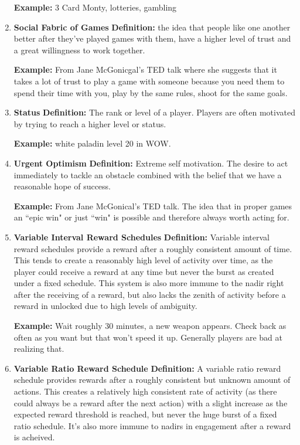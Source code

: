\begin{enumerate}
\textbf{Example:} 3 Card Monty, lotteries, gambling

\item \textbf{Social Fabric of Games}
\textbf{Definition:} the idea that people like one another better after they’ve played games with them, have a higher level of trust and a great willingness to work together.

\textbf{Example:} From Jane McGonicgal’s TED talk where she suggests that it takes a lot of trust to play a game with someone because you need them to spend their time with you, play by the same rules, shoot for the same goals.

\item \textbf{Status}
\textbf{Definition:} The rank or level of a player. Players are often motivated by trying to reach a higher level or status.

\textbf{Example:} white paladin level 20 in WOW.

\item \textbf{Urgent Optimism}
\textbf{Definition:} Extreme self motivation. The desire to act immediately to tackle an obstacle combined with the belief that we have a reasonable hope of success.

\textbf{Example:} From Jane McGonical’s TED talk. The idea that in proper games an ``epic win" or just ``win" is possible and therefore always worth acting for.

\item \textbf{Variable Interval Reward Schedules}
\textbf{Definition:} Variable interval reward schedules provide a reward after a roughly consistent amount of time. This tends to create a reasonably high level of activity over time, as the player could receive a reward at any time but never the burst as created under a fixed schedule. This system is also more immune to the nadir right after the receiving of a reward, but also lacks the zenith of activity before a reward in unlocked due to high levels of ambiguity.

\textbf{Example:} Wait roughly 30 minutes, a new weapon appears. Check back as often as you want but that won’t speed it up. Generally players are bad at realizing that.

\item \textbf{Variable Ratio Reward Schedule}
\textbf{Definition:} A variable ratio reward schedule provides rewards after a roughly consistent but unknown amount of actions. This creates a relatively high consistent rate of activity (as there could always be a reward after the next action) with a slight increase as the expected reward threshold is reached, but never the huge burst of a fixed ratio schedule. It’s also more immune to nadirs in engagement after a reward is acheived.


\end{enumerate}

